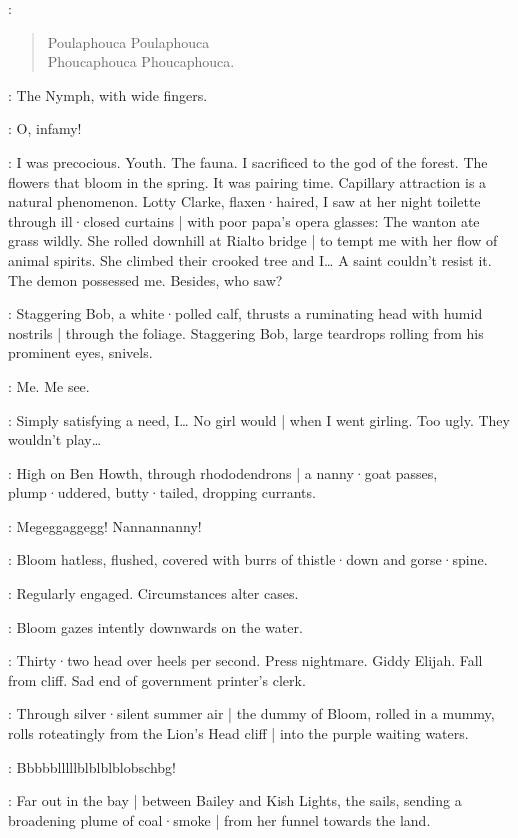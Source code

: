 \Waterfall:
\begin{verse}
    Poulaphouca Poulaphouca\\
    Phoucaphouca Phoucaphouca.
\end{verse}

:
The Nymph,
with wide fingers.

\Nymph:
O,
infamy!

\Bloom:
I was precocious.
Youth.
The fauna.
I sacrificed to the god of the forest.
The flowers that bloom in the spring.
It was pairing time.
Capillary attraction is a natural phenomenon.
Lotty Clarke,
flaxen·haired,
I saw at her night toilette through ill·closed curtains |
with poor papa's opera glasses:
The wanton ate grass wildly.
She rolled downhill at Rialto bridge |
to tempt me with her flow of animal spirits.
She climbed their crooked tree and I…
A saint couldn't resist it.
The demon possessed me.
Besides,
who saw?

:
Staggering Bob,
a white·polled calf,
%
thrusts a ruminating head with humid nostrils |
through the foliage.
Staggering Bob,
large teardrops rolling from his prominent eyes,
snivels.

\StaggeringBob:
Me.
Me see.

\Bloom:
Simply satisfying a need,
I…
No girl would |
when I went girling.
Too ugly.
They wouldn't play…

:
High on Ben Howth,
through rhododendrons |
a nanny·goat passes,
plump·uddered,
butty·tailed,
dropping currants.

\Nannygoat:
Megeggaggegg!
Nannannanny!

:
Bloom hatless,
flushed,
covered with burrs of thistle·down and gorse·spine.

\Bloom:
Regularly engaged.
Circumstances alter cases.

:
Bloom gazes intently downwards on the water.

\Bloom:
Thirty·two head over heels per second.
Press nightmare.
Giddy Elijah.
Fall from cliff.
Sad end of government printer's clerk.

:
Through silver·silent summer air |
the dummy of Bloom,
rolled in a mummy,
rolls roteatingly from the Lion's Head cliff |
into the purple waiting waters.

\Dummymummy[3b]:
Bbbbblllllblblblblobschbg!

:
Far out in the bay |
between Bailey and Kish Lights,
the  sails,
sending a broadening plume of coal·smoke |
from her funnel towards the land.

